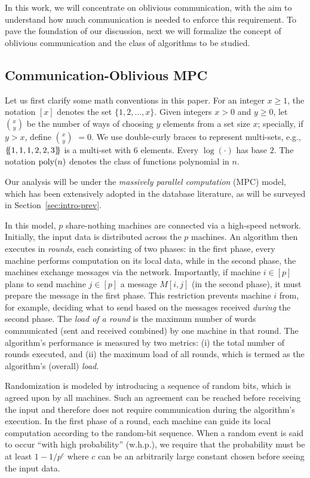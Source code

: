 \documentclass[sigconf]{acmart}
\def\vgap{\vspace{0mm}}
\def\extraspacing{\vspace{1mm} \noindent}
\newcommand*{\ldb}{\{\mskip-5mu\{}
\newcommand*{\rdb}{\}\mskip-5mu\}}
\begin{document}
In this work, we will concentrate on oblivious communication, with the aim to understand how much communication is needed to enforce this requirement. To pave the foundation of our discussion, next we will formalize the concept of oblivious communication and the class of algorithms to be studied.

\subsection{Communication-Oblivious MPC} \label{sec:intro-prob}

Let us first clarify some math conventions in this paper. For an integer $x \ge 1$, the notation $[x]$ denotes the set $\{1, 2, ..., x\}$. Given integers $x > 0$ and $y \ge 0$, let $\binom{x}{y}$ be the number of ways of choosing $y$ elements from a set size $x$; specially, if $y > x$, define $\binom{x}{y}$ $= 0$. We use double-curly braces to represent multi-sets, e.g., $\ldb 1, 1, 1, 2, 2, 3\rdb$ is a multi-set with 6 elements. Every $\log(\cdot)$ has base $2$. The notation $\operatorname*{poly}(n)$ denotes the class of functions polynomial in $n$.


\extraspacing {\bf The MPC Model.} Our analysis will be under the {\em massively parallel computation} (MPC) model, which has been extensively adopted in the database literature, as will be surveyed in Section~\ref{sec:intro-prev}.

\vgap

In this model, $p$ share-nothing machines are connected via a high-speed network. Initially, the input data is distributed across the $p$ machines. An algorithm then executes in {\em rounds}, each consisting of two phases: in the first phase, every machine performs computation on its local data, while in the second phase, the machines exchange messages via the network. Importantly, if machine $i \in [p]$ plans to send machine $j \in [p]$ a message $M[i,j]$ (in the second phase), it must prepare the message in the first phase. This restriction prevents machine $i$ from, for example, deciding what to send based on the messages received {\em during} the second phase. The {\em load of a round} is the maximum number of words communicated (sent and received combined) by one machine in that round. The algorithm's performance is measured by two metrics: (i) the total number of rounds executed, and (ii) the maximum load of all rounds, which is termed as the algorithm's (overall) {\em load}.

\vgap

Randomization is modeled by introducing a sequence of random bits, which is agreed upon by all machines. Such an agreement can be reached before receiving the input and therefore does not require communication during the algorithm's execution. In the first phase of a round, each machine can guide its local computation according to the random-bit sequence. When a random event is said to occur ``with high probability'' (w.h.p.), we require that the probability must be at least $1-1/p^c$ where $c$ can be an arbitrarily large constant chosen before seeing the input data.
\end{document}
